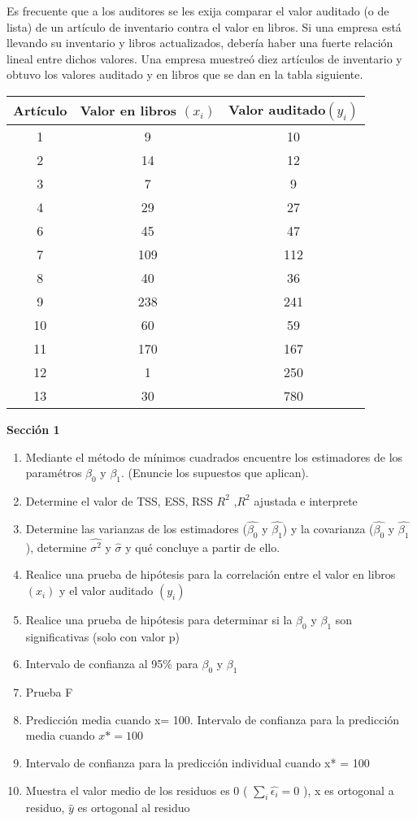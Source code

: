 \documentclass{../oxmathproblems}
\begin{document}
\begin{questions}

\miquestion Es frecuente que a los auditores se les exija comparar el valor auditado (o de lista) de un artículo de inventario contra el valor en libros. Si una empresa está llevando su inventario y libros actualizados, debería haber una fuerte relación lineal entre dichos valores. Una empresa muestreó diez artículos de inventario y obtuvo los valores auditado y en libros que se dan en la tabla siguiente. 

\begin{tabular}{|c|c|c|}
\hline
Artículo & Valor en libros $(x_i)$ & Valor auditado$(y_i)$ \\ \hline
1 & 9 & 10\\
2 & 14 & 12\\
3 & 7 & 9\\ 
4 & 29  & 27\\ 
6 & 45 & 47\\ 
7 & 109 & 112\\ 
8 & 40 & 36\\ 
9 & 238 & 241\\ 
10 & 60 & 59\\
11 & 170 & 167\\
12 & 1 & 250\\
13 & 30 & 780\\
\hline
\end{tabular}


\textbf {Sección 1} 

\begin{enumerate}
  \item Mediante el método de mínimos cuadrados encuentre los estimadores de los paramétros $\beta_0$ y $\beta_1$. (Enuncie los supuestos que aplican). 
  \item Determine el valor de TSS, ESS, RSS  $R^2$ ,$R^2$ ajustada   e interprete 
  \item Determine las varianzas de los estimadores ($\hat{\beta_0}$ y $\hat{\beta_1}$) y la covarianza  ($\hat{\beta_0}$ y $\hat{\beta_1}$), determine $\hat{\sigma^2}$ y $\hat{\sigma}$ y qué concluye a partir de ello.
  \item Realice una prueba de hipótesis para la correlación entre el valor en libros $(x_i)$ y el valor auditado $(y_i)$
  \item Realice una prueba de hipótesis para determinar si la  $\beta_0$ y $\beta_1$ son significativas (solo con valor p) 
  \item Intervalo de confianza al 95\% para $\beta_0$ y $\beta_1$ 
   \item Prueba F 
   \item Predicción media cuando x= 100. Intervalo de confianza para la predicción media cuando $x* = 100$
   \item Intervalo de confianza para la predicción individual cuando x* = 100
   \item Muestra el valor medio de los residuos es 0 ( $\sum_{i}\hat{\epsilon_i}=0$ ), x es ortogonal a residuo, $\hat{y}$  es ortogonal al residuo  
\end{enumerate}





\end{questions}
\end{document}
